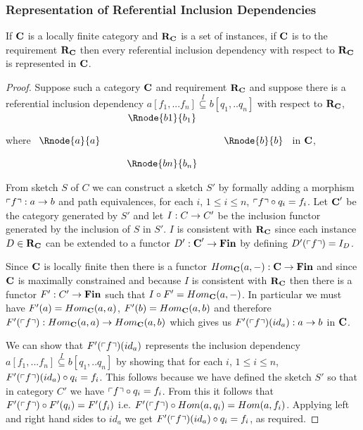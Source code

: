 \subsubsection{Representation of Referential Inclusion Dependencies}
\begin{lemma}
\label{catincdsrepresented}
If $\textbf{C}$ is a locally finite category and $\textbf{R}_{\textbf{C}}$ is a set of instances, if $\textbf{C}$ is 
 to the requirement $\textbf{R}_{\textbf{C}}$ then
every referential inclusion dependency with respect to $\textbf{R}_{\textbf{C}}$ is represented in $\textbf{C}$.
\end{lemma}
\begin{proof}
Suppose such  a category $\textbf{C}$ and  requirement $\textbf{R}_{\textbf{C}}$ 
 and suppose there is a referential inclusion dependency
$a[f_1,...f_n] \overset{I}{\subseteq} b[q_1,..q_n]$ with respect to $\textbf{R}_{\textbf{C}}$,
where
$
\begin{array}{c p{0.25cm} c  p{0.25cm} c }
             &&   \Rnode{b1}{b_1} &&              \\[0.4cm]
\Rnode{a}{a} &&                   && \Rnode{b}{b} \\[0.4cm]
             &&   \Rnode{bn}{b_n} &&              
\end{array} 
$
in $\textbf{C}$, 

From sketch $S$ of $C$ we can construct a sketch $S'$ by formally adding a morphism $\left\ulcorner f\right\urcorner: a \rightarrow b$
and path equivalences, for each $i$, $1 \leq i \leq n$, $\left\ulcorner f\right\urcorner \circ q_i = f_i$. Let $\textbf{C}'$ be the category generated by $S'$ and
let $I: C \rightarrow C'$ be the inclusion functor generated by the inclusion of $S$ in $S'$. $I$ is consistent with $\textbf{R}_{\textbf{C}}$ since
each instance $D \in  \textbf{R}_{\textbf{C}}$ can be extended to a functor $D': \textbf{C}' \rightarrow \textbf{Fin}$ by defining $D'(\left\ulcorner f\right\urcorner)=I_D$.

Since $\textbf{C}$ is locally finite then there is a functor $Hom_{\textbf{C}}(a,-): \textbf{C} \rightarrow \textbf{Fin}$ and since $\textbf{C}$ is maximally constrained and because $I$ is consistent with $\textbf{R}_{\textbf{C}}$ then there is a functor $F': C' \rightarrow \textbf{Fin}$
such that $I \circ F' = Hom_{\textbf{C}}(a,-)$. In particular we must have 
$F'(a)=Hom_{\textbf{C}}(a,a)$,
$F'(b)=Hom_{\textbf{C}}(a,b)$ and therefore $F'(\left\ulcorner f\right\urcorner):Hom_{\textbf{C}}(a,a) \rightarrow Hom_{\textbf{C}}(a,b)$ which gives us
$F'(\left\ulcorner f\right\urcorner)(id_a): a \rightarrow b$ in $\textbf{C}$. 

We can show that $F'(\left\ulcorner f\right\urcorner)(id_a)$ represents
the inclusion dependency $a[f_1,...f_n] \overset{I}{\subseteq} b[q_1,..q_n]$ by showing that for 
each $i$, $1 \leq i \leq n$, $F'(\left\ulcorner f\right\urcorner)(id_a) \circ q_i = f_i$. This follows because we have defined
the sketch $S'$ so that in category $C'$ we have $\left\ulcorner f\right\urcorner \circ q_i = f_i$. From this it follows
that $F'(\left\ulcorner f\right\urcorner) \circ F'(q_i) = F'(f_i)$ i.e. $F'(\left\ulcorner f\right\urcorner) \circ Hom(a,q_i) = Hom(a,f_i)$. 
Applying left and right hand sides to $id_a$ we get $F'(\left\ulcorner f\right\urcorner)(id_a) \circ q_i = f_i$, as required.
\end{proof}


